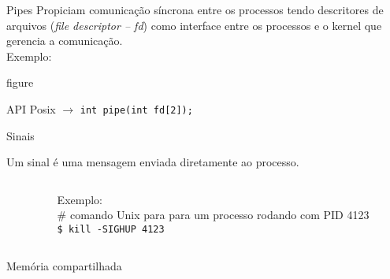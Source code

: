 \begin{frame}{Pipes}
  \small Propiciam comunicação síncrona entre os processos tendo
  descritores de arquivos ({\em file descriptor -- fd}) como interface
  entre os
  processos e o kernel que gerencia a comunicação.\\
  \smallskip
  Exemplo:\\
\begin{center}
  figure
  
\end{center}

API Posix $\rightarrow$ {\tt int pipe(int fd[2]);}

\end{frame}

\begin{frame}{Sinais}
  
  Um sinal é uma mensagem enviada diretamente ao processo.
  \vspace{1.5cm}

  \begin{columns}
     \begin{column}{.5\textwidth}

\end{column}

\begin{column}{.5\textwidth}
  \small
  Exemplo:\\
  \# comando {\sc Unix} para para um processo rodando com PID
    4123\\
    \bigskip
  {\tt \$ kill -SIGHUP 4123}

  

\end{column}      

\end{columns}

\end{frame}

\begin{frame}{Memória compartilhada}
  
  \begin{center}
    
  \end{center}

\end{frame}

